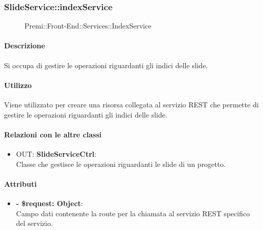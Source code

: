 		\subsubsection{SlideService::indexService}
		\begin{figure}[h]
			\centering
			\caption[Premi::Front-End::Services::IndexService]{Premi::Front-End::Services::IndexService}
		\end{figure}
		
		\paragraph{Descrizione}
		Si occupa di gestire le operazioni riguardanti gli indici delle slide.
		
		\paragraph{Utilizzo}
		Viene utilizzato per creare una risorsa collegata al servizio REST che permette di gestire le operazioni riguardanti gli indici delle slide.
		
		\paragraph{Relazioni con le altre classi}
		\begin{itemize}
			\item OUT: \textbf{SlideServiceCtrl}:\\
			Classe che gestisce le operazioni riguardanti le slide di un progetto.
		\end{itemize}
		
		\paragraph{Attributi}
		\begin{itemize}
			\item \textbf{- \$request: Object}:\\
			Campo dati contenente la route per la chiamata al servizio REST specifico del servizio.
		\end{itemize}	
		
